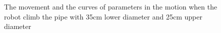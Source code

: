 \begin{figure}[!h]
	\caption{The movement and the curves of parameters in the motion when the robot climb the pipe with 35cm lower diameter and 25cm upper diameter}
\end{figure}

